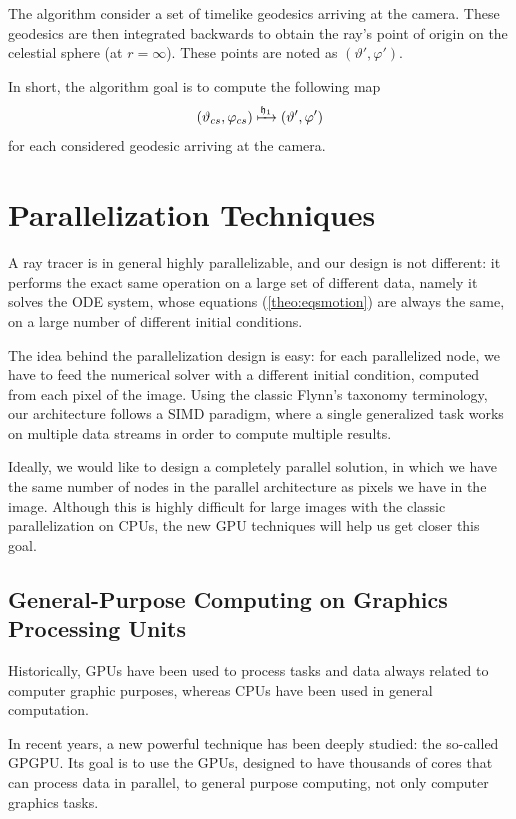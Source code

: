 The algorithm consider a set of timelike geodesics arriving at the camera. These geodesics are then integrated backwards to obtain the ray's point of origin on the celestial sphere (at $r = \infty$). These points are noted as $(\vartheta', \varphi')$.

In short, the algorithm goal is to compute the following map
\begin{equation}
	\label{eq:initmap}
	(\vartheta_{cs}, \varphi_{cs}) \xmapsto{\mathfrak{h}_1} (\vartheta', \varphi')
\end{equation}
for each considered geodesic arriving at the camera.

\section{Parallelization Techniques}
\label{sec:parallel}

A ray tracer is in general highly parallelizable, and our design is not different: it performs the exact same operation on a large set of different data, namely it solves the \ac{ODE} system, whose equations (\autoref{theo:eqsmotion}) are always the same, on a large number of different initial conditions.

The idea behind the parallelization design is easy: for each parallelized node, we have to feed the numerical solver with a different initial condition, computed from each pixel of the image. Using the classic Flynn's taxonomy \cite{flynn72} terminology, our architecture follows a \ac{SIMD} paradigm, where a single generalized task works on multiple data streams in order to compute multiple results.

Ideally, we would like to design a completely parallel solution, in which we have the same number of nodes in the parallel architecture as pixels we have in the image. Although this is highly difficult for large images with the classic parallelization on \acp{CPU}, the new \ac{GPU} techniques will help us get closer this goal.

\subsection{General-Purpose Computing on Graphics Processing Units}

Historically, \acp{GPU} have been used to process tasks and data always related to computer graphic purposes, whereas \acp{CPU} have been used in general computation.

In recent years, a new powerful technique has been deeply studied: the so-called \ac{GPGPU}. Its goal is to use the \acp{GPU}, designed to have thousands of cores that can process data in parallel, to general purpose computing, not only computer graphics tasks.

